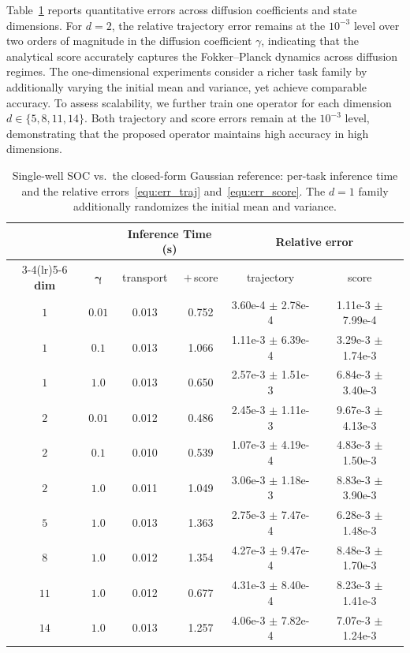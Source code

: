 \documentclass[preprint]{elsarticle}
\newcommand{\g}{\gamma}
\begin{document}
Table~\ref{tab:soc_error_comparison} reports quantitative errors across diffusion coefficients and state dimensions. For $d=2$, the relative trajectory error remains at the $10^{-3}$ level over two orders of magnitude in the diffusion coefficient $\gamma$, indicating that the analytical score accurately captures the Fokker--Planck dynamics across diffusion regimes. The one-dimensional experiments consider a richer task family by additionally varying the initial mean and variance, yet achieve comparable accuracy. To assess scalability, we further train one operator for each dimension $d\in\{5,8,11,14\}$. Both trajectory and score errors remain at the $10^{-3}$ level, demonstrating that the proposed operator maintains high accuracy in high dimensions.

\begin{table}[!htpb]
    \centering
    \caption{Single-well SOC vs.\ the closed-form Gaussian reference: per-task
    inference time and the relative errors~\eqref{equ:err_traj}
    and~\eqref{equ:err_score}. The $d=1$ family additionally
    randomizes the initial mean and variance.
    }
    \label{tab:soc_error_comparison}
    \begin{tabular}{cccccc}
        \toprule
         & & \multicolumn{2}{c}{\textbf{Inference Time (s)}}
            & \multicolumn{2}{c}{\textbf{Relative error}} \\
        \cmidrule(lr){3-4}\cmidrule(lr){5-6}
        \textbf{dim} & $\boldsymbol{\g}$ & transport & $+$\,score
            & trajectory & score \\
        \midrule
        $1$ & $0.01$ & 0.013 & 0.752 & 3.60e-4 $\pm$ 2.78e-4 & 1.11e-3 $\pm$ 7.99e-4 \\
        $1$ & $0.1$ & 0.013 & 1.066 & 1.11e-3 $\pm$ 6.39e-4 & 3.29e-3 $\pm$ 1.74e-3 \\
        $1$ & $1.0$ & 0.013 & 0.650 & 2.57e-3 $\pm$ 1.51e-3 & 6.84e-3 $\pm$ 3.40e-3 \\
        \midrule
        $2$ & $0.01$ & 0.012 & 0.486 & 2.45e-3 $\pm$ 1.11e-3 & 9.67e-3 $\pm$ 4.13e-3 \\
        $2$ & $0.1$ & 0.010 & 0.539 & 1.07e-3 $\pm$ 4.19e-4 & 4.83e-3 $\pm$ 1.50e-3 \\
        $2$ & $1.0$ & 0.011 & 1.049 & 3.06e-3 $\pm$ 1.18e-3 & 8.83e-3 $\pm$ 3.90e-3 \\
        \midrule
        $5$ & $1.0$ & 0.013 & 1.363 & 2.75e-3 $\pm$ 7.47e-4 & 6.28e-3 $\pm$ 1.48e-3 \\
        $8$ & $1.0$ & 0.012 & 1.354 & 4.27e-3 $\pm$ 9.47e-4 & 8.48e-3 $\pm$ 1.70e-3 \\
        $11$ & $1.0$ & 0.012 & 0.677 & 4.31e-3 $\pm$ 8.40e-4 & 8.23e-3 $\pm$ 1.41e-3 \\
        $14$ & $1.0$ & 0.013 & 1.257 & 4.06e-3 $\pm$ 7.82e-4 & 7.07e-3 $\pm$ 1.24e-3 \\
        \bottomrule
    \end{tabular}
\end{table}
\end{document}
